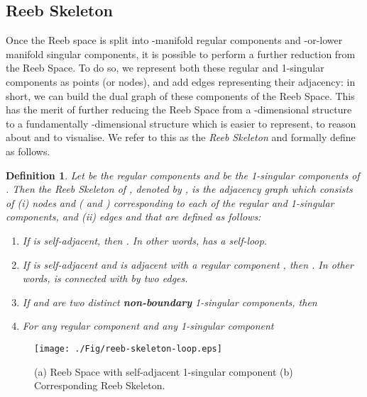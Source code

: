 \documentclass[twocolumn]{article}
\newtheorem{dfn}{Definition}[section]
\begin{document}
\subsection{Reeb Skeleton}
\label{sec:ReebSkeleton}
Once the Reeb space  is split into -manifold regular components
and -or-lower manifold singular components, it is possible to
perform a further reduction from the Reeb Space. To do so, we
represent both these regular and 1-singular components as points (or nodes), and add edges representing their
adjacency: in short, we can build the dual graph of these components of the Reeb Space.  This has
the merit of further reducing the Reeb Space from a -dimensional structure to a fundamentally 
-dimensional structure which is easier to represent, to reason about and to visualise.  We refer to this
as the \emph{Reeb Skeleton} and formally define as follows. 

\begin{dfn}
\label{dfn:reeb-skeleton}
 Let  be the regular components and  be the 1-singular components of . Then
the Reeb Skeleton of , denoted by , is the adjacency graph which consists of
(i) nodes   and  ( and ) corresponding to each of the regular and 1-singular
components,  and (ii) edges  and  that are
defined as follows:
\begin{enumerate}
\item If  is self-adjacent, then . In other words,  has
a self-loop.
\item If  is self-adjacent and  is adjacent with a regular component , then
. In other words,  is connected with  by two edges.
\item If  and  are two distinct \textbf{non-boundary}
  1-singular components, then

\item For any regular component  and any 1-singular component 

\end{enumerate}
\end{dfn}
\begin{figure}[t!]
\begin{center}
\texttt{[image: ./Fig/reeb-skeleton-loop.eps]}
\end{center}
\vspace*{-2ex}
\caption{(a) Reeb Space with self-adjacent 1-singular component (b)
  Corresponding Reeb Skeleton.}
\label{fig:reeb-skeleton2}
\end{figure}
\end{document}
